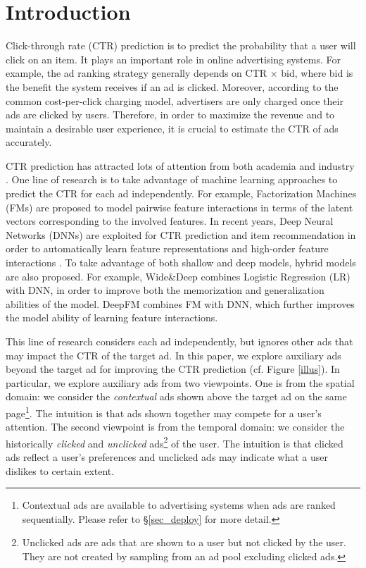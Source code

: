 \documentclass[sigconf]{acmart}
\begin{document}
\fancyhead{}

\maketitle

\section{Introduction}
Click-through rate (CTR) prediction is to predict the probability that a user will click on an item. It plays an important role in online advertising systems. For example, the ad ranking strategy generally depends on CTR $\times$ bid, where bid is the benefit the system receives if an ad is clicked. Moreover, according to the common cost-per-click charging model, advertisers are only charged once their ads are clicked by users. Therefore, in order to maximize the revenue and to maintain a desirable user experience, it is crucial to estimate the CTR of ads accurately.

CTR prediction has attracted lots of attention from both academia and industry \cite{he2014practical,cheng2016wide,shan2016deep,he2017neural,zhou2018deep}. One line of research is to take advantage of machine learning approaches to predict the CTR for each ad independently. For example, Factorization Machines (FMs) \cite{rendle2010factorization} are proposed to model pairwise feature interactions in terms of the latent vectors corresponding to the involved features.
In recent years, Deep Neural Networks (DNNs) are exploited for CTR prediction and item recommendation in order to automatically learn feature representations and high-order feature interactions \cite{van2013deep,zhang2016deep,covington2016deep}. To take advantage of both shallow and deep models, hybrid models are also proposed. For example, Wide\&Deep \cite{cheng2016wide} combines Logistic Regression (LR) with DNN, in order to improve both the memorization and generalization abilities of the model.
DeepFM \cite{guo2017deepfm} combines FM with DNN, which further improves the model ability of learning feature interactions.

This line of research considers each ad independently, but ignores other ads that may impact the CTR of the target ad.
In this paper, we explore auxiliary ads beyond the target ad for improving the CTR prediction (cf. Figure \ref{illus}). In particular, we explore auxiliary ads from two viewpoints. One is from the spatial domain: we consider the \emph{contextual} ads shown above the target ad on the same page\footnote{Contextual ads are available to advertising systems when ads are ranked sequentially. Please refer to \S\ref{sec_deploy} for more detail.}. The intuition is that ads shown together may compete for a user's attention. The second viewpoint is from the temporal domain: we consider the historically \emph{clicked} and \emph{unclicked} ads\footnote{Unclicked ads are ads that are shown to a user but not clicked by the user. They are not created by sampling from an ad pool excluding clicked ads.} of the user. The intuition is that clicked ads reflect a user's preferences and unclicked ads may indicate what a user dislikes to certain extent.
\end{document}
